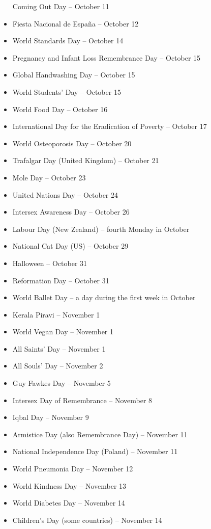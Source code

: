 \documentclass[
  openany]{book}
\begin{document}
\begin{itemize}
  Coming Out Day -- October 11
\item
  Fiesta Nacional de España -- October 12
\item
  World Standards Day -- October 14
\item
  Pregnancy and Infant Loss Remembrance Day -- October 15
\item
  Global Handwashing Day -- October 15
\item
  World Students' Day -- October 15
\item
  World Food Day -- October 16
\item
  International Day for the Eradication of Poverty -- October 17
\item
  World Osteoporosis Day -- October 20
\item
  Trafalgar Day (United Kingdom) -- October 21
\item
  Mole Day -- October 23
\item
  United Nations Day -- October 24
\item
  Intersex Awareness Day -- October 26
\item
  Labour Day (New Zealand) -- fourth Monday in October
\item
  National Cat Day (US) -- October 29
\item
  Halloween -- October 31
\item
  Reformation Day -- October 31
\item
  World Ballet Day -- a day during the first week in October
\item
  Kerala Piravi -- November 1
\item
  World Vegan Day -- November 1
\item
  All Saints' Day -- November 1
\item
  All Souls' Day -- November 2
\item
  Guy Fawkes Day -- November 5
\item
  Intersex Day of Remembrance -- November 8
\item
  Iqbal Day -- November 9
\item
  Armistice Day (also Remembrance Day) -- November 11
\item
  National Independence Day (Poland) -- November 11
\item
  World Pneumonia Day -- November 12
\item
  World Kindness Day -- November 13
\item
  World Diabetes Day -- November 14
\item
  Children's Day (some countries) -- November 14

\end{itemize}
\end{document}
